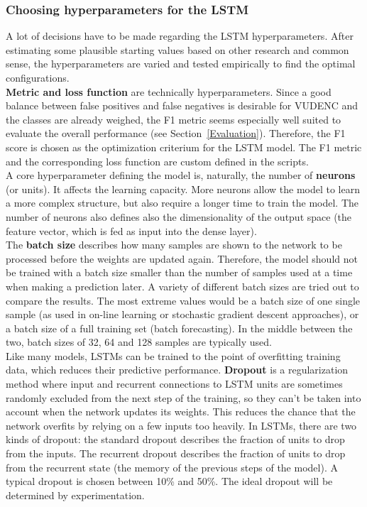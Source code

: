 \documentclass[
a4paper,
pagesize,
pdftex,
12pt,
twoside, %
BCOR=5mm, %
ngerman,
fleqn,
final,
]{scrartcl}
\begin{document}
	\subsubsection{Choosing hyperparameters for the LSTM}
	A lot of decisions have to be made regarding the LSTM hyperparameters. After estimating some plausible starting values based on other research and common sense, the hyperparameters are varied and tested empirically to find the optimal configurations.\\
	\textbf{Metric and loss function} are technically hyperparameters. Since a good balance between false positives and false negatives is desirable for VUDENC and the classes are already weighed, the F1 metric seems especially well suited to evaluate the overall performance (see Section~\ref{Evaluation}). Therefore, the F1 score is chosen as the optimization criterium for the LSTM model. The F1 metric and the corresponding loss function are custom defined in the scripts.\\
	A core hyperparameter defining the model is, naturally, the number of \textbf{neurons} (or units). It affects the learning capacity. More neurons allow the model to learn a more complex structure, but also require a longer time to train the model. The number of neurons also defines also the dimensionality of the output space (the feature vector, which is fed as input into the dense layer).\\  
	The \textbf{batch size} describes how many samples are shown to the network to be processed before the weights are updated again. Therefore, the model should not be trained with a batch size smaller than the number of samples used at a time when making a prediction later. A variety of different batch sizes are tried out to compare the results. The most extreme values would be a batch size of one single sample (as used in on-line learning or stochastic gradient descent approaches), or a batch size of a full training set (batch forecasting). In the middle between the two, batch sizes of 32, 64 and 128 samples are typically used.\\
	Like many models, LSTMs can be trained to the point of overfitting training data, which reduces their predictive performance. \textbf{Dropout} is a regularization method where input and recurrent connections to LSTM units are sometimes randomly excluded from the next step of the training, so they can't be taken into account when the network updates its weights. This reduces the chance that the network overfits by relying on a few inputs too heavily. In LSTMs, there are two kinds of dropout: the standard dropout describes the fraction of units to drop from the inputs. The recurrent dropout describes the fraction of units to drop from the recurrent state (the memory of the previous steps of the model). A typical dropout is chosen between 10\% and 50\%. The ideal dropout will be determined by experimentation.\\
\end{document}
